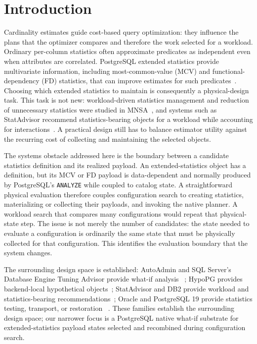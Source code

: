 \section{Introduction}

Cardinality estimates guide cost-based query optimization: they influence the
plans that the optimizer compares and therefore the work selected for a
workload. Ordinary per-column statistics often approximate predicates as
independent even when attributes are correlated. PostgreSQL extended statistics
provide multivariate information, including most-common-value (MCV) and
functional-dependency (FD) statistics, that can improve estimates for such
predicates~\cite{ilyas2004cords,postgresql16docs}. Choosing which extended
statistics to maintain is consequently a physical-design task. This task is
not new: workload-driven statistics management and reduction of unnecessary
statistics were studied in MNSA~\cite{chaudhuri2001statistics}, and systems
such as StatAdvisor recommend statistics-bearing objects for a workload while
accounting for interactions~\cite{elhelw2009statadvisor}. A practical design
still has to balance estimator utility against the recurring cost of collecting
and maintaining the selected objects.

The systems obstacle addressed here is the boundary between a candidate
statistics definition and its realized payload. An extended-statistics object
has a definition, but its MCV or FD payload is data-dependent and normally
produced by PostgreSQL's \texttt{ANALYZE} while coupled to catalog state. A
straightforward physical evaluation therefore couples configuration search to
creating statistics, materializing or collecting their payloads, and invoking
the native planner. A workload search that compares many configurations would
repeat that physical-state step. The issue is not merely the number of
candidates: the state needed to evaluate a configuration is ordinarily the
same state that must be physically collected for that configuration. This
identifies the evaluation boundary that the system changes.

The surrounding design space is established: AutoAdmin and SQL Server's
Database Engine Tuning Advisor provide what-if analysis
~\cite{chaudhuri1998whatif,microsoftdta}; HypoPG provides backend-local
hypothetical objects~\cite{hypopg}; StatAdvisor and DB2 provide workload and
statistics-bearing recommendations~\cite{elhelw2009statadvisor,db2statviews};
Oracle and PostgreSQL 19 provide statistics testing, transport, or restoration
~\cite{oraclependingstats,oracleimportstats,postgresql19restore}.  These
families establish the surrounding design space; our narrower focus is a
PostgreSQL native what-if substrate for extended-statistics payload states
selected and recombined during configuration search.

